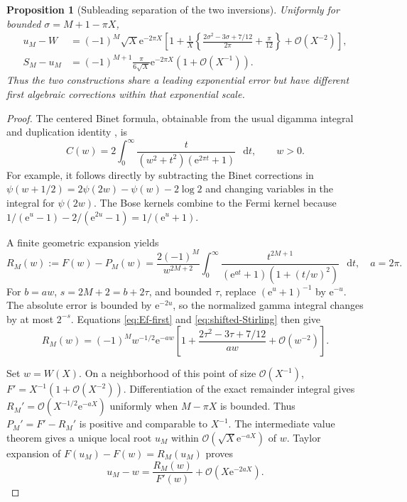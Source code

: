 \documentclass[11pt,a4paper]{article}
\newtheorem{proposition}[theorem]{Proposition}
\theoremstyle{definition}
\numberwithin{equation}{section}
\newcommand{\dd}{\mathop{}\!\mathrm{d}}
\newcommand{\ee}{\mathrm{e}}
\newcommand{\Oh}{\mathcal O}
\begin{document}
\begin{proposition}[Subleading separation of the two inversions]
\label{prop:comparison}
Uniformly for bounded $\sigma=M+1-\pi X$,
\begin{align}
 u_M-W&=(-1)^M\sqrt X\ee^{-2\pi X}
 \left[1+\frac1X\left\{
    \frac{2\sigma^2-3\sigma+7/12}{2\pi}+\frac\pi{12}
                  \right\}+\Oh(X^{-2})\right],
 \label{eq:forward-sharp}\\
 S_M-u_M&=(-1)^{M+1}\frac{\pi}{6\sqrt X}\ee^{-2\pi X}
                  \left(1+\Oh(X^{-1})\right).
 \label{eq:separation}
\end{align}
Thus the two constructions share a leading exponential error but have different first algebraic corrections within that exponential scale.
\end{proposition}
\begin{proof}
The centered Binet formula, obtainable from the usual digamma integral and duplication identity \cite[\S\S5.5,5.9]{dlmf}, is
\begin{equation}
 C(w)=2\int_0^\infty
             \frac{t}{(w^2+t^2)(\ee^{2\pi t}+1)}\,\dd t,
 \qquad w>0.
 \label{eq:fermi}
\end{equation}
For example, it follows directly by subtracting the Binet corrections in
$\psi(w+1/2)=2\psi(2w)-\psi(w)-2\log2$ and changing variables in the integral for $\psi(2w)$. The Bose kernels combine to the Fermi kernel because
$1/(\ee^u-1)-2/(\ee^{2u}-1)=1/(\ee^u+1)$.

A finite geometric expansion yields
\begin{equation}
 R_M(w):=F(w)-P_M(w)
 =\frac{2(-1)^M}{w^{2M+2}}
   \int_0^\infty\frac{t^{2M+1}}{(\ee^{at}+1)(1+(t/w)^2)}\,\dd t,
 \quad a=2\pi.
 \label{eq:forward-rem}
\end{equation}
For $b=aw$, $s=2M+2=b+2\tau$, and bounded $\tau$, replace
$(\ee^u+1)^{-1}$ by $\ee^{-u}$. The absolute error is bounded by $\ee^{-2u}$, so the normalized gamma integral changes by at most $2^{-s}$. Equations \eqref{eq:Ef-first} and \eqref{eq:shifted-Stirling} then give
\begin{equation}
 R_M(w)=(-1)^M w^{-1/2}\ee^{-aw}
 \left[1+\frac{2\tau^2-3\tau+7/12}{aw}+\Oh(w^{-2})\right].
 \label{eq:forward-rem-sharp}
\end{equation}

Set $w=W(X)$. On a neighborhood of this point of size $\Oh(X^{-1})$, $F'=X^{-1}(1+\Oh(X^{-2}))$. Differentiation of the exact remainder integral gives
$R_M'=\Oh(X^{-1/2}\ee^{-aX})$ uniformly when $M-\pi X$ is bounded. Thus $P_M'=F'-R_M'$ is positive and comparable to $X^{-1}$. The intermediate value theorem gives a unique local root $u_M$ within $\Oh(\sqrt X\ee^{-aX})$ of $w$. Taylor expansion of
$F(u_M)-F(w)=R_M(u_M)$ proves
\begin{equation}
 u_M-w=\frac{R_M(w)}{F'(w)}+\Oh(X\ee^{-2aX}).
 \label{eq:forward-transport}
\end{equation}


\end{proof}
\end{document}
